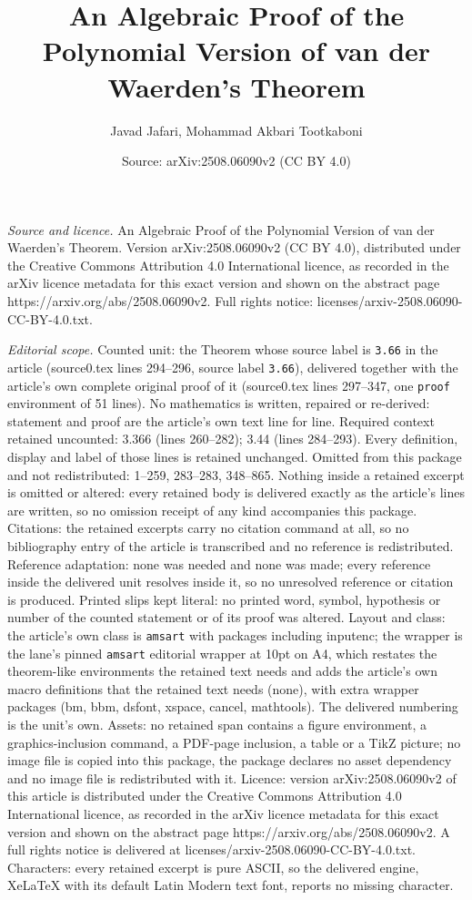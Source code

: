 \documentclass[10pt,a4paper]{amsart}
\title[An Algebraic Proof of the Polynomial Version of van der Waer]{An Algebraic Proof of the Polynomial Version of van der Waerden's Theorem}
\author{Javad Jafari, Mohammad Akbari Tootkaboni}
\date{Source: arXiv:2508.06090v2 (CC BY 4.0)}
\begin{document}
\maketitle

\noindent\emph{Source and licence.} An Algebraic Proof of the Polynomial Version of van der Waerden's Theorem. Version arXiv:2508.06090v2 (CC BY 4.0), distributed under the Creative Commons Attribution 4.0 International licence, as recorded in the arXiv licence metadata for this exact version and shown on the abstract page https://arxiv.org/abs/2508.06090v2. Full rights notice: licenses/arxiv-2508.06090-CC-BY-4.0.txt.\par\smallskip

\noindent\textit{Editorial scope.} Counted unit: the Theorem whose source label is \texttt{3.66} in the article (source0.tex lines 294--296, source label \texttt{3.66}), delivered together with the article's own complete original proof of it (source0.tex lines 297--347, one \texttt{proof} environment of 51 lines). No mathematics is written, repaired or re-derived: statement and proof are the article's own text line for line. Required context retained uncounted: 3.366 (lines 260--282); 3.44 (lines 284--293). Every definition, display and label of those lines is retained unchanged. Omitted from this package and not redistributed: 1--259, 283--283, 348--865. Nothing inside a retained excerpt is omitted or altered: every retained body is delivered exactly as the article's lines are written, so no omission receipt of any kind accompanies this package. Citations: the retained excerpts carry no citation command at all, so no bibliography entry of the article is transcribed and no reference is redistributed. Reference adaptation: none was needed and none was made; every reference inside the delivered unit resolves inside it, so no unresolved reference or citation is produced. Printed slips kept literal: no printed word, symbol, hypothesis or number of the counted statement or of its proof was altered. Layout and class: the article's own class is \texttt{amsart} with packages including inputenc; the wrapper is the lane's pinned \texttt{amsart} editorial wrapper at 10pt on A4, which restates the theorem-like environments the retained text needs and adds the article's own macro definitions that the retained text needs (none), with extra wrapper packages (bm, bbm, dsfont, xspace, cancel, mathtools). The delivered numbering is the unit's own. Assets: no retained span contains a figure environment, a graphics-inclusion command, a PDF-page inclusion, a table or a TikZ picture; no image file is copied into this package, the package declares no asset dependency and no image file is redistributed with it. Licence: version arXiv:2508.06090v2 of this article is distributed under the Creative Commons Attribution 4.0 International licence, as recorded in the arXiv licence metadata for this exact version and shown on the abstract page https://arxiv.org/abs/2508.06090v2. A full rights notice is delivered at licenses/arxiv-2508.06090-CC-BY-4.0.txt. Characters: every retained excerpt is pure ASCII, so the delivered engine, XeLaTeX with its default Latin Modern text font, reports no missing character.
\end{document}
